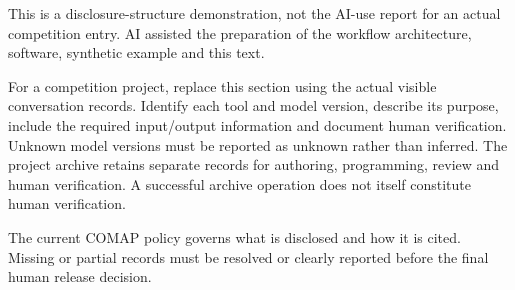 This is a disclosure-structure demonstration, not the AI-use report for an
actual competition entry. AI assisted the preparation of the workflow
architecture, software, synthetic example and this text.

For a competition project, replace this section using the actual visible
conversation records. Identify each tool and model version, describe its
purpose, include the required input/output information and document human
verification. Unknown model versions must be reported as unknown rather than
inferred. The project archive retains separate records for authoring,
programming, review and human verification. A successful archive operation
does not itself constitute human verification.

The current COMAP policy governs what is disclosed and how it is
cited\cite{comap2025ai}. Missing or partial records must be resolved or clearly
reported before the final human release decision.
